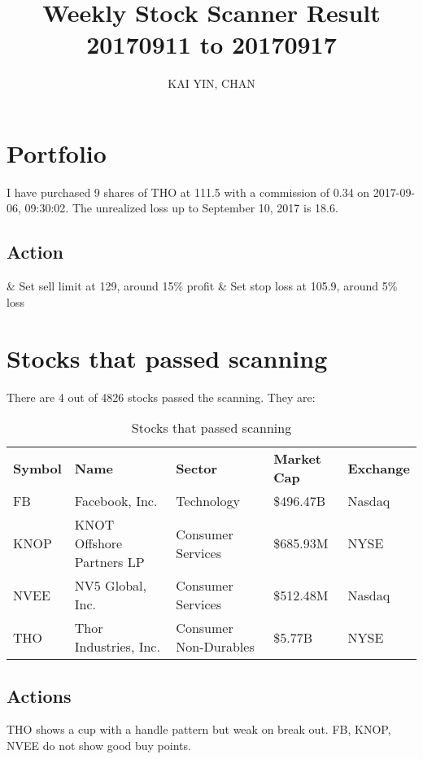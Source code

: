 \documentclass{article}
\begin{document}
\title{Weekly Stock Scanner Result \\ 20170911 to 20170917}
\author{KAI YIN, CHAN}
\maketitle

\section{Portfolio}
I have purchased 9 shares of THO at 111.5 with a commission of 0.34 on 2017-09-06, 09:30:02. The unrealized loss up to September 10, 2017 is 18.6.

\subsection{Action}
\begin{easylist}
& Set sell limit at 129, around 15\% profit
& Set stop loss at 105.9, around 5\% loss
\end{easylist}

\section{Stocks that passed scanning}

There are 4 out of 4826 stocks passed the scanning.  They are:
\begin{table}[htbp]
  \caption{Stocks that passed scanning}
    \begin{tabular}{lllll}
    \textbf{Symbol} & \textbf{Name} & \textbf{Sector} & \textbf{Market Cap} & \textbf{Exchange} \\
    FB    & Facebook, Inc. & Technology & \$496.47B & Nasdaq \\
    KNOP  & KNOT Offshore Partners LP & Consumer Services & \$685.93M & NYSE \\
    NVEE  & NV5 Global, Inc. & Consumer Services & \$512.48M & Nasdaq \\
    THO   & Thor Industries, Inc. & Consumer Non-Durables & \$5.77B & NYSE \\
    \end{tabular}%
  \label{tab:addlabel}%
\end{table}%

\subsection{Actions}
THO shows a cup with a handle pattern but weak on break out. FB, KNOP, NVEE do not show good buy points.
\end{document}
